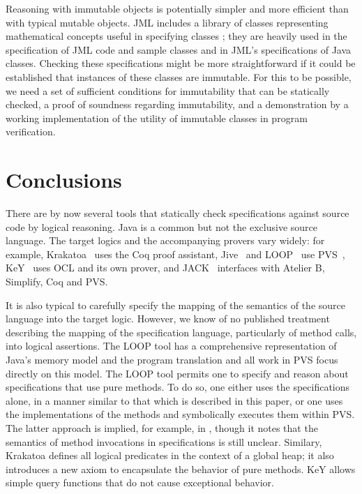 \documentclass{sig-alternate}
\begin{document}
Reasoning with immutable objects is potentially simpler and more efficient than with typical
mutable objects.  JML includes a library of classes representing mathematical 
concepts useful in specifying classes \cite{Leavens-etal03a}; they are heavily used in
the specification of JML code and sample classes and in JML's specifications of Java classes.
Checking these specifications might be more straightforward if it could be 
established that instances of these classes are immutable.  For this to be possible, we need 
a set of sufficient conditions for immutability that can be statically checked, a proof of 
soundness regarding immutability, and a demonstration by a working implementation
of the utility of immutable classes in program verification.


\section{Conclusions}

There are by now several tools
 that statically check specifications against source code by logical reasoning.
Java is a common but not the exclusive source language.  The target logics and the
accompanying provers vary widely:  for example,
Krakatoa~\cite{krakatoa03a} uses the Coq proof assistant, 
Jive~\cite{MeyerMuellerPoetzsch-Heffter00}
and LOOP~\cite{Jacobs04,JacobsPoll01a} use PVS~\cite{OwreRRSS96},
KeY~\cite{Key2003} uses OCL and its own prover, 
and JACK~\cite{BurdyRequet02} interfaces with 
Atelier B, Simplify, Coq and PVS.

It is also typical to carefully specify the mapping of the semantics of the source language
into the target logic.  However, we know of no published treatment 
describing the mapping of
the specification language, particularly of method calls, into logical assertions.  
The LOOP tool has a comprehensive representation of Java's memory
model and the program translation and all work in PVS focus directly
on this model.  The LOOP tool permits one to specify and reason about
specifications that use pure methods. To do so, one either uses the
specifications alone, in a manner similar to that which is described
in this paper, or one uses the implementations of the methods and 
symbolically executes them within PVS.
The latter approach is implied, for example, in \cite{JacobsKiniryWarnier03},
though it notes that the semantics of method invocations in specifications is still unclear.
Similary, Krakatoa defines all logical predicates in the context of a global heap; 
it also introduces a new axiom to encapsulate the behavior of pure
methods.  KeY allows simple query functions that do not cause exceptional behavior.
\end{document}
